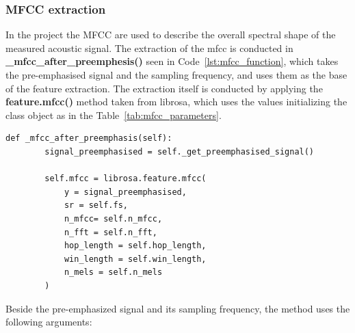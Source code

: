     \subsubsection{MFCC extraction}
    \raggedbottom
    In the project the MFCC are used to describe the overall spectral shape of the measured acoustic signal.
    The extraction of the mfcc is conducted in \textbf{\_mfcc\_after\_preemphesis()} seen in Code~\ref{lst:mfcc_function}, which takes the pre-emphasised signal and the sampling frequency, and uses them as the base of the feature extraction. The extraction itself is conducted by applying the \textbf{feature.mfcc()} method taken from librosa, which uses the values initializing the class object as in the Table~\ref{tab:mfcc_parameters}.\\
    \begin{lstlisting}[style=pythonstyle, caption={Function used for the mfcc extraction}, label={lst:mfcc_function}]
    def _mfcc_after_preemphasis(self):
        signal_preemphasised = self._get_preemphasised_signal()

        self.mfcc = librosa.feature.mfcc(
            y = signal_preemphasised,
            sr = self.fs,
            n_mfcc= self.n_mfcc,
            n_fft = self.n_fft,
            hop_length = self.hop_length,
            win_length = self.win_length,
            n_mels = self.n_mels
        )
    \end{lstlisting}
    Beside the pre-emphasized signal and its sampling frequency, the method uses the following arguments:\\
